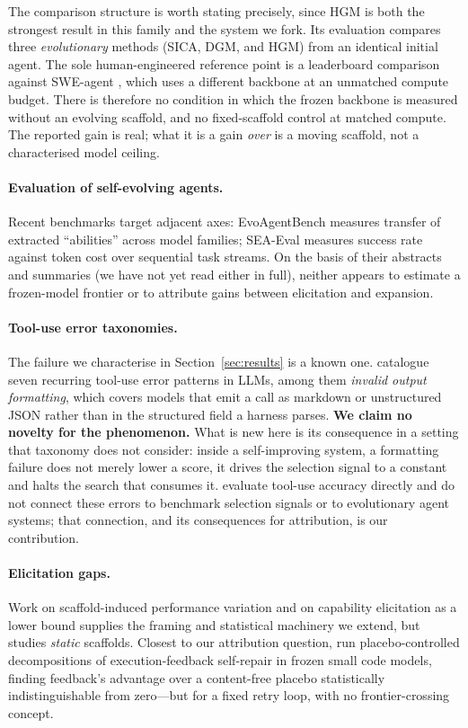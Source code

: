 \documentclass{article}
\begin{document}
The comparison structure is worth stating precisely, since HGM is both the
strongest result in this family and the system we fork. Its evaluation compares
three \emph{evolutionary} methods (SICA, DGM, and HGM) from an identical
initial agent. The sole human-engineered reference point is a leaderboard
comparison against SWE-agent \citep{yang2024sweagent}, which uses a different
backbone at an unmatched compute budget. There is therefore no condition in
which the frozen backbone is measured without an evolving scaffold, and no
fixed-scaffold control at matched compute. The reported gain is real; what it
is a gain \emph{over} is a moving scaffold, not a characterised model ceiling.

\paragraph{Evaluation of self-evolving agents.}
Recent benchmarks target adjacent axes: EvoAgentBench
\citep{gao2026evoagentbench} measures transfer of extracted ``abilities''
across model families; SEA-Eval \citep{seaeval2026} measures success rate
against token cost over sequential task streams. On the basis of their
abstracts and summaries (we have not yet read either in full), neither
appears to estimate a frozen-model frontier or to attribute gains between
elicitation and expansion.

\paragraph{Tool-use error taxonomies.}
The failure we characterise in Section~\ref{sec:results} is a known one.
\citet{kokane2024toolscan} catalogue seven recurring tool-use error patterns
in LLMs, among them \emph{invalid output formatting}, which covers models
that emit a call as markdown or unstructured JSON rather than in the
structured field a harness parses. \textbf{We claim no novelty for the
phenomenon.} What is new here is its consequence in a setting that taxonomy
does not consider: inside a self-improving system, a formatting failure does
not merely lower a score, it drives the selection signal to a constant and
halts the search that consumes it. \citet{kokane2024toolscan} evaluate
tool-use accuracy directly and do not connect these errors to benchmark
selection signals or to evolutionary agent systems; that connection, and its
consequences for attribution, is our contribution.

\paragraph{Elicitation gaps.}
Work on scaffold-induced performance variation \citep{starace2026scaffold}
and on capability elicitation as a lower bound \citep{metr2025horizon} supplies
the framing and statistical machinery we extend, but studies \emph{static}
scaffolds. Closest to our attribution question, \citet{iscan2026placebo}
run placebo-controlled decompositions of execution-feedback self-repair in
frozen small code models, finding feedback's advantage over a content-free
placebo statistically indistinguishable from zero---but for a fixed retry loop,
with no frontier-crossing concept.
\end{document}
